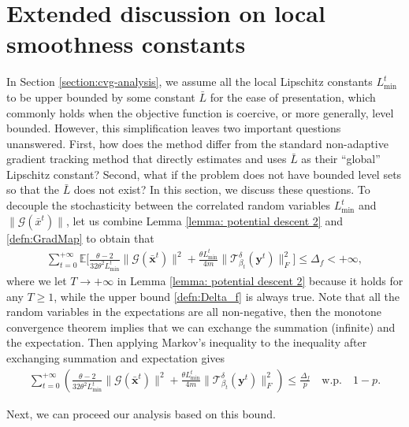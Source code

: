 \documentclass{article}
\newcommand{\ctdb}{\mathcal{T}^\delta_{\beta_t}}
\newcommand{\byt}{\mathbf{y}^t}
\newcommand{\EE}{\mathbb{E}}
\newcommand{\bx}{\mathbf{x}}
\begin{document}
 

\section{Extended discussion on local smoothness constants}
\label{section:discussion}
In Section \ref{section:cvg-analysis}, we assume all the local Lipschitz constants $L_{\min}^t$ to be upper bounded by some constant $\bar{L}$ for the ease of presentation, which commonly holds when the objective function is coercive, or more generally, level bounded. However, this simplification leaves two important questions unanswered. First, how does the method differ from the standard non-adaptive gradient tracking method that directly estimates and uses $\bar{L}$ as their ``global'' Lipschitz constant? Second, what if the problem does not have bounded level sets so that the $\bar{L}$ does not exist? In this section, we discuss these questions. To decouple the stochasticity between the correlated random variables $L_{\min}^t$ and $\|\mathcal{G}(\bar{x}^t)\|$, let us combine Lemma \ref{lemma: potential descent 2} and \eqref{defn:GradMap} to obtain that 
\begin{align}
\sum_{t=0}^{+\infty} \EE\bigg[\frac{\theta-2}{32\theta^2 L_{\min}^t}\|\mathcal{G}(\bar{\bx}^t)\|^2 + \frac{\theta L_{\min}^t}{4m}\big\|\ctdb(\byt)\big\|_F^2\bigg] \leq \Delta_f<+\infty\nonumber,
\end{align}
where we let $T\to+\infty$ in Lemma \ref{lemma: potential descent 2} because it holds for any $T\geq1$, while the upper bound \eqref{defn:Delta_f} is always true. Note that all the random variables in the expectations are all non-negative, then the monotone convergence theorem \cite{yeh2006real} implies that we can exchange the summation (infinite) and the expectation. Then applying Markov's inequality to the inequality after exchanging summation and expectation gives 
\begin{align}
\label{eqn:Markov-Bound}
\sum_{t=0}^{+\infty} \left(\frac{\theta-2}{32\theta^2 L_{\min}^t}\|\mathcal{G}(\bar{\bx}^t)\|^2 + \frac{\theta L_{\min}^t}{4m}\big\|\ctdb\!(\byt)\big\|_F^2\right) \leq \frac{\Delta_f}{p}  \quad\text{w.p.}\quad 1-p.
\end{align}

Next, we can proceed our analysis based on this bound. 
\end{document}
